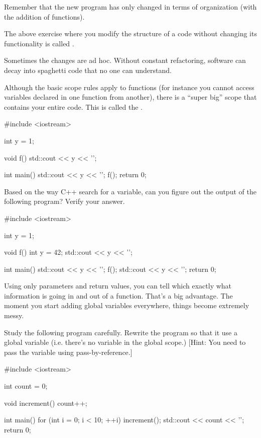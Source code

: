 Remember that the new program has only changed in terms of organization (with the addition of functions).

The above exercise where you modify the structure of a code without changing its functionality is called .

Sometimes the changes are ad hoc. Without constant refactoring, software can decay into spaghetti code that no one can understand.

\newpage{}

Although the basic scope rules apply to functions (for instance you cannot access variables declared in one function from another), there is a ``super big'' scope that contains your entire code. This is called the .

\begin{consolethree}[escapeinside=||]
#include <iostream>

int y = 1;

void f()
{
    std::cout << y << '\n';
}

int main()
{
    std::cout << y << '\n';
    f();
    return 0;
}
\end{consolethree}


\newpage{}

Based on the way C++ search for a variable, can you figure out the output of the following program? Verify your answer.

\begin{consolethree}[escapeinside=||]
#include <iostream>

int y = 1;

void f()
{
    int y = 42;
    std::cout << y << '\n';
}

int main()
{
    std::cout << y << '\n';
    f();
    std::cout << y << '\n';
    return 0;
}
\end{consolethree}

Using only parameters and return values, you can tell which exactly what information is going in and out of a function. That's a big advantage. The moment you start adding global variables everywhere, things become extremely messy.

\begin{ex}
Study the following program carefully. Rewrite the program so that it  use a global variable (i.e. there's no variable in the global scope.) [Hint: You need to pass the variable using pass-by-reference.]

\begin{consolethree}[escapeinside=||]
#include <iostream>

int count = 0;

void increment()
{
    count++;
}

int main()
{
    for (int i = 0; i < 10; ++i)
    {
        increment();
    }
    std::cout << count << '\n';
    return 0;
}
\end{consolethree}
\end{ex}


